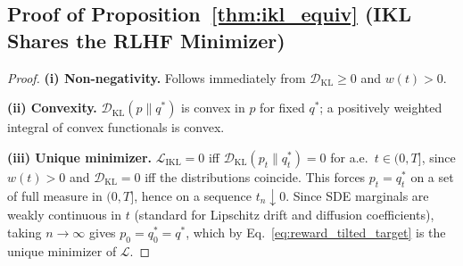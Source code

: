 \subsection{Proof of Proposition~\ref{thm:ikl_equiv} (IKL Shares the RLHF Minimizer)}
\label{app:proof_thm_ikl_equiv}
\begin{proof}
\textbf{(i) Non-negativity.} Follows immediately from $\mathcal{D}_{\mathrm{KL}}\geq 0$ and $w(t)>0$.

\textbf{(ii) Convexity.} $\mathcal{D}_{\mathrm{KL}}(p\|q^*)$ is convex in $p$ for fixed $q^*$; a positively weighted integral of convex functionals is convex.

\textbf{(iii) Unique minimizer.} $\mathcal{L}_{\mathrm{IKL}}=0$ iff $\mathcal{D}_{\mathrm{KL}}(p_t\|q_t^*)=0$ for a.e.\ $t\in(0,T]$, since $w(t)>0$ and $\mathcal{D}_{\mathrm{KL}}=0$ iff the distributions coincide. This forces $p_t=q_t^*$ on a set of full measure in $(0,T]$, hence on a sequence $t_n\downarrow 0$. Since SDE marginals are weakly continuous in $t$ (standard for Lipschitz drift and diffusion coefficients), taking $n\to\infty$ gives $p_0=q_0^*=q^*$, which by Eq.~\eqref{eq:reward_tilted_target} is the unique minimizer of $\mathcal{L}$.
\end{proof}

